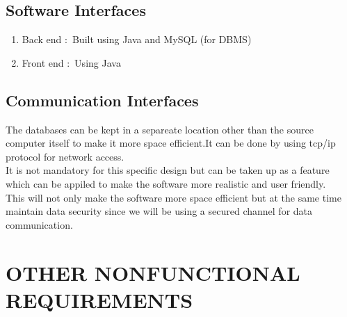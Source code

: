 \documentclass{article}
\begin{document}
\subsection{Software Interfaces}
\begin{enumerate}
\item Back end  $:$ Built using Java and MySQL (for DBMS)
\item Front end $:$ Using Java 
\end{enumerate}

\subsection{Communication Interfaces}
The databases can be kept in a separeate location other than the source computer itself to make it more space efficient.It can be done by using tcp/ip protocol for network access.
\\It is not mandatory for this specific design but can be taken up as a  feature which can be appiled to make the software more realistic and user friendly.
\\This will not only make the software more space efficient but at the same time maintain data security since we will be using a secured channel for data communication.

\section{OTHER NONFUNCTIONAL REQUIREMENTS}
\end{document}
